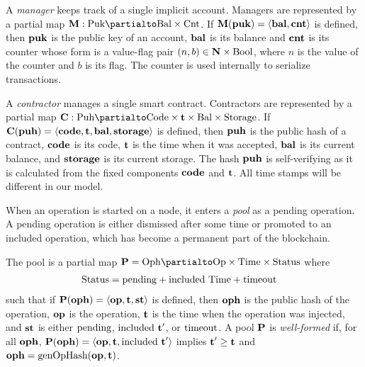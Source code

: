 \documentclass[runningheads]{llncs}
\begin{document}
A \emph{manager} keeps track of a single implicit account. Managers are
represented by a partial map $\MANAGERS : \TPUK \partialto \TBAL
\times \TCOU$. If $\textbf{M} (\textbf{puk}) = \langle\textbf{bal}, \textbf{cnt}\rangle$ is defined, then  $\textbf{puk}$ is the
public key of an account, $\textbf{bal}$ is its
balance and $\textbf{cnt}$ is its counter whose form is a value-flag pair
$(n,b) \in \textbf{N}\times\text{Bool}$, where $n$ is the value of the counter
and ${b}$ is its flag.   The counter is used internally to serialize transactions.

A \emph{contractor} manages a single smart contract. Contractors are
represented by a partial map $\CONTRACTORS : \TPUH \partialto
\TCODE \times \TIME  \times \TBAL \times  \TSTORAGE$. If $\textbf{C} (\textbf{puh}) = \langle
\textbf{code}, \textbf{t}, \textbf{bal}, \textbf{storage} \rangle $ is defined, then $\textbf{puh}$ is the
public hash of a contract,
$\textbf{code}$ is its  code,
$\textbf{t}$ is the time when it was accepted,
$\textbf{bal}$ is its current balance,
and $\textbf{storage}$ is its current storage. The hash $\textbf{puh}$ is
self-verifying as it is calculated from the fixed components $\textbf{code}$
and $\textbf{t}$. All time stamps will be different in our model.

When an operation is started on a node, it enters a \emph{pool} as a
pending operation. A pending operation is either dismissed after some time or
promoted to an included operation, which has become a permanent part
of the blockchain.

The pool is a partial map $  \PENDING= \TOPH \partialto
\TOP\times \TTIME \times \TSTATUS$ where
\begin{align*}
  \text{Status}&= \text{pending} + \text{included}\ \text{Time} + \text{timeout}
\end{align*}
such that
if $\textbf{P}(\textbf{oph}) = \langle  \textbf{op}, \textbf{t}, \textbf{st}
\rangle $ is defined, then $\textbf{oph}$ is the public hash of the operation, $\textbf{op}$ is the operation, $\textbf{t}$ is the time when the
operation was injected, and $\textbf{st}$ is either $\text{pending}$,
$\text{included}\ \textbf{t}'$, or $\text{timeout}$.
A pool $\textbf{P}$ is \emph{well-formed} if, for all $\textbf{oph}$, $\textbf{P} (\textbf{oph}) =
\langle\textbf{op},\textbf{t}, \text{included}\ \textbf{t}'\rangle$ implies $\textbf{t}' \ge
\textbf{t}$ and $\textbf{oph} = \textup{genOpHash} (\textbf{op}, \textbf{t})$.
\end{document}

